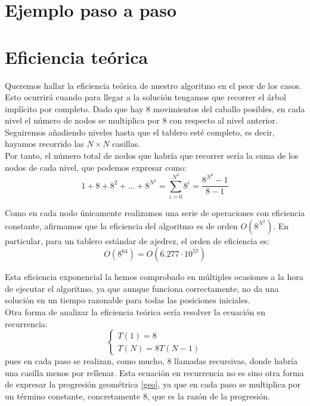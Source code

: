 \documentclass[11pt]{article}
\begin{document}
\section*{Ejemplo paso a paso}


\section*{Eficiencia teórica}

Queremos hallar la eficiencia teórica de nuestro algoritmo en el peor de los casos. Esto ocurrirá cuando para llegar a la solución tengamos que recorrer el árbol implícito por completo. Dado que hay 8 movimientos del caballo posibles, en cada nivel el número de nodos se multiplica por 8 con respecto al nivel anterior. Seguiremos añadiendo niveles hasta que el tablero esté completo, es decir, hayamos recorrido las $N \times N$ casillas.\\

Por tanto, el número total de nodos que habría que recorrer sería la suma de los nodos de cada nivel, que podemos expresar como:
\begin{equation} \label{geo}
1 + 8 + 8^2 + \hdots + 8^{N^2} = \sum_{i=0}^{N^2} 8^i = \frac{8^{N^2} - 1}{8 - 1}
\end{equation}

Como en cada nodo únicamente realizamos una serie de operaciones con eficiencia constante, afirmamos que la eficiencia del algoritmo es de orden $O\left( 8^{N^2} \right)$. En particular, para un tablero estándar de ajedrez, el orden de eficiencia es: $$ O(8^{64}) = O(6.277 \cdot 10^{57} )$$

Esta eficiencia exponencial la hemos comprobado en múltiples ocasiones a la hora de ejecutar el algoritmo, ya que aunque funciona correctamente, no da una solución en un tiempo razonable para todas las posiciones iniciales.\\

Otra forma de analizar la eficiencia teórica sería resolver la ecuación en recurrencia: $$\begin{cases} T(1) = 8\\
                             T(N) = 8T(N-1)
\end{cases}$$ pues en cada paso se realizan, como mucho, $8$ llamadas recursivas, donde habría una casilla menos por rellenar. Esta ecuación en recurrencia no es sino otra forma de expresar la progresión geométrica \eqref{geo}, ya que en cada paso se multiplica por un término constante, concretamente $8$, que es la razón de la progresión.
\end{document}
